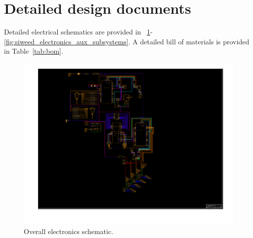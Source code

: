 \documentclass[hardware,article,submit,pdftex,moreauthors]{Definitions/mdpi}
\begin{document}
\appendixstart
\appendix
\section[\appendixname~\thesection]{Detailed design documents}
Detailed electrical schematics are provided in \figurename~\ref{fig:siweed_electronics}-\ref{fig:siweed_electronics_aux_subsystems}.
A detailed bill of materials is provided in Table~\ref{tab:bom}.

\begin{landscape}
\begin{figure}[tb]
	\centering
	\includegraphics[height=0.95\textwidth, width=\linewidth]{diagrams/SIWEED_ElecDrawings_and_UpdatedBOM/PDFs/siweed_electronics.pdf}
	\caption{Overall electronics schematic.}
	\label{fig:siweed_electronics}
\end{figure}
\end{landscape}
\end{document}
